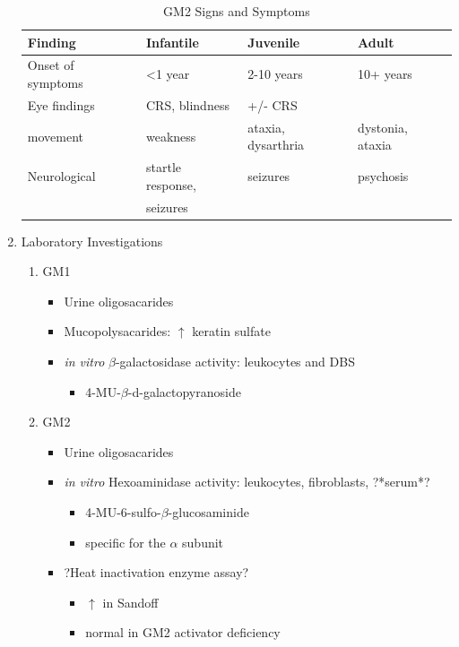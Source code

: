 \documentclass{scrartcl}
\begin{document}
\begin{enumerate}
\begin{table}[htbp]
\caption{\label{tab:org4c7954d}
GM2 Signs and Symptoms}
\centering
\begin{tabular}{llll}
Finding & Infantile & Juvenile & Adult\\
\hline
Onset of symptoms & <1 year & 2-10 years & 10+ years\\
Eye findings & CRS, blindness & +/- CRS & \\
movement & weakness & ataxia, dysarthria & dystonia, ataxia\\
Neurological & startle response, & seizures & psychosis\\
 & seizures &  & \\
\end{tabular}
\end{table}

\item Laboratory Investigations
\label{sec:org32e24ae}

\begin{enumerate}
\item GM1
\label{sec:org34a608b}

\begin{itemize}
\item Urine oligosacarides
\item Mucopolysacarides: \(\uparrow\) keratin sulfate
\item \emph{in vitro} \(\beta\)-galactosidase activity: leukocytes and DBS
\begin{itemize}
\item 4-MU-\(\beta\)-d-galactopyranoside
\end{itemize}
\end{itemize}

\item GM2
\label{sec:org0095f33}
\begin{itemize}
\item Urine oligosacarides
\item \emph{in vitro} Hexoaminidase activity: leukocytes, fibroblasts, ?*serum*?
\begin{itemize}
\item 4-MU-6-sulfo-\(\beta\)-glucosaminide
\item specific for the \(\alpha\) subunit
\end{itemize}
\item ?Heat inactivation enzyme assay?
\begin{itemize}
\item \(\uparrow\) in Sandoff
\item normal in GM2 activator deficiency
\end{itemize}


\end{itemize}
\end{enumerate}
\end{enumerate}
\end{document}
